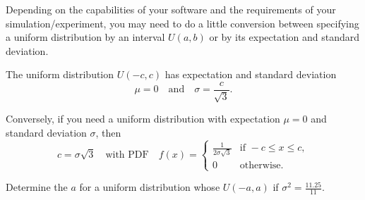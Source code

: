 \documentclass[../main.tex]{subfiles}
\begin{document}
%

\clearpage

Depending on the capabilities of your software and the requirements of your simulation/experiment, you may need to do a little conversion between specifying a uniform distribution by an interval \(U(a,b)\) or by its expectation and standard deviation.

\begin{method}
  The uniform distribution \(U(-c,c)\) has expectation and standard deviation
  \[
    \mu = 0
    \quad\text{and}\quad
    \sigma = \frac{c}{\sqrt{3}}.
  \]

  Conversely, if you need a uniform distribution with expectation \(\mu = 0\) and standard deviation \(\sigma\), then 
  \[
    c = \sigma \sqrt{3}
    \quad\text{with PDF}\quad
    f(x) = 
    \begin{cases}
      \frac{1}{2\sigma \sqrt{3}} &\text{if } -c \le x \le c, \\[2ex]
      0 &\text{otherwise}.
    \end{cases}
  \]
\end{method}

\begin{example} \label{ex:uniform-distribution-from-mean-and-stddev-expectation}
  Determine the \(a\) for a uniform distribution whose \(U(-a,a)\) if \(\sigma^{2} = \frac{11.25}{11}\).

\end{example}
\end{document}
